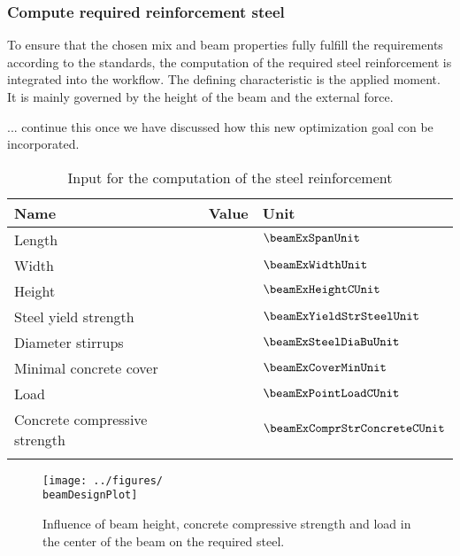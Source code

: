 \subsubsection{Compute required reinforcement steel}
To ensure that the chosen mix and beam properties fully fulfill the requirements according to the standards, the computation of the required steel reinforcement is integrated into the workflow.
The defining characteristic is the applied moment.
It is mainly governed by the height of the beam and the external force.

... continue this once we have discussed how this new optimization goal con be incorporated.



\begin{table}[ht]
	\begin{center}
		\begin{minipage}{.9\textwidth}
			\caption{Input for the computation of the steel reinforcement}\label{tab:beamdesigninput}
			\begin{tabular}{lrl}
				\toprule
				Name &  Value&Unit\\
				\midrule
				Length & \beamExSpan &$\beamExSpanUnit$\\
				Width & \beamExWidth &$\beamExWidthUnit$\\
				Height& \beamExHeightC &$\beamExHeightCUnit$\\
				Steel yield strength& \beamExYieldStrSteel &$\beamExYieldStrSteelUnit$\\
				Diameter stirrups& \beamExSteelDiaBu &$\beamExSteelDiaBuUnit$\\
				Minimal concrete cover& \beamExCoverMin &$\beamExCoverMinUnit$\\
				Load& \beamExPointLoadC &$\beamExPointLoadCUnit$\\
				Concrete compressive strength& \beamExComprStrConcreteC &$\beamExComprStrConcreteCUnit$\\
				\botrule
			\end{tabular}
		\end{minipage}
	\end{center}
	
\end{table}






\begin{figure}[ht]%
	\centering
	\texttt{[image: ../figures/\\beamDesignPlot]}
	\caption{Influence of beam height, concrete compressive strength and load in the center of the beam on the required steel.}\label{fig:beamdesign}
\end{figure}


